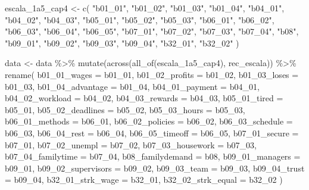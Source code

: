 \documentclass[
  letterpaper,
  DIV=11,
  numbers=noendperiod]{scrreprt}
\newenvironment{Shaded}{\begin{snugshade}}{\end{snugshade}}
\newcommand{\AttributeTok}[1]{\textcolor[rgb]{0.40,0.45,0.13}{#1}}
\newcommand{\FunctionTok}[1]{\textcolor[rgb]{0.28,0.35,0.67}{#1}}
\newcommand{\NormalTok}[1]{\textcolor[rgb]{0.00,0.23,0.31}{#1}}
\newcommand{\OtherTok}[1]{\textcolor[rgb]{0.00,0.23,0.31}{#1}}
\newcommand{\SpecialCharTok}[1]{\textcolor[rgb]{0.37,0.37,0.37}{#1}}
\newcommand{\StringTok}[1]{\textcolor[rgb]{0.13,0.47,0.30}{#1}}
\begin{document}
\begin{Shaded}
\begin{Highlighting}[]
\NormalTok{escala\_1a5\_cap4 }\OtherTok{\textless{}{-}} \FunctionTok{c}\NormalTok{(}
  \StringTok{"b01\_01"}\NormalTok{, }\StringTok{"b01\_02"}\NormalTok{, }\StringTok{"b01\_03"}\NormalTok{, }\StringTok{"b01\_04"}\NormalTok{,}
  \StringTok{"b04\_01"}\NormalTok{, }\StringTok{"b04\_02"}\NormalTok{, }\StringTok{"b04\_03"}\NormalTok{,}
  \StringTok{"b05\_01"}\NormalTok{, }\StringTok{"b05\_02"}\NormalTok{, }\StringTok{"b05\_03"}\NormalTok{,}
  \StringTok{"b06\_01"}\NormalTok{, }\StringTok{"b06\_02"}\NormalTok{, }\StringTok{"b06\_03"}\NormalTok{, }\StringTok{"b06\_04"}\NormalTok{, }\StringTok{"b06\_05"}\NormalTok{,}
  \StringTok{"b07\_01"}\NormalTok{, }\StringTok{"b07\_02"}\NormalTok{, }\StringTok{"b07\_03"}\NormalTok{, }\StringTok{"b07\_04"}\NormalTok{,}
  \StringTok{"b08"}\NormalTok{,}
  \StringTok{"b09\_01"}\NormalTok{, }\StringTok{"b09\_02"}\NormalTok{, }\StringTok{"b09\_03"}\NormalTok{, }\StringTok{"b09\_04"}\NormalTok{,}
  \StringTok{"b32\_01"}\NormalTok{, }\StringTok{"b32\_02"}
\NormalTok{)}

\NormalTok{data }\OtherTok{\textless{}{-}}\NormalTok{ data }\SpecialCharTok{\%\textgreater{}\%}
  \FunctionTok{mutate}\NormalTok{(}\FunctionTok{across}\NormalTok{(}\FunctionTok{all\_of}\NormalTok{(escala\_1a5\_cap4), rec\_escala)) }\SpecialCharTok{\%\textgreater{}\%}
  \FunctionTok{rename}\NormalTok{(}
    \AttributeTok{b01\_01\_wages       =}\NormalTok{ b01\_01,}
    \AttributeTok{b01\_02\_profits     =}\NormalTok{ b01\_02,}
    \AttributeTok{b01\_03\_loses       =}\NormalTok{ b01\_03,}
    \AttributeTok{b01\_04\_advantage   =}\NormalTok{ b01\_04,}
    \AttributeTok{b04\_01\_payment     =}\NormalTok{ b04\_01,}
    \AttributeTok{b04\_02\_workload    =}\NormalTok{ b04\_02,}
    \AttributeTok{b04\_03\_rewards     =}\NormalTok{ b04\_03,}
    \AttributeTok{b05\_01\_tired       =}\NormalTok{ b05\_01,}
    \AttributeTok{b05\_02\_deadlines   =}\NormalTok{ b05\_02,}
    \AttributeTok{b05\_03\_hours       =}\NormalTok{ b05\_03,}
    \AttributeTok{b06\_01\_methods     =}\NormalTok{ b06\_01,}
    \AttributeTok{b06\_02\_policies    =}\NormalTok{ b06\_02,}
    \AttributeTok{b06\_03\_schedule    =}\NormalTok{ b06\_03,}
    \AttributeTok{b06\_04\_rest        =}\NormalTok{ b06\_04,}
    \AttributeTok{b06\_05\_timeoff     =}\NormalTok{ b06\_05,}
    \AttributeTok{b07\_01\_secure      =}\NormalTok{ b07\_01,}
    \AttributeTok{b07\_02\_unempl      =}\NormalTok{ b07\_02,}
    \AttributeTok{b07\_03\_housework   =}\NormalTok{ b07\_03,}
    \AttributeTok{b07\_04\_familytime  =}\NormalTok{ b07\_04,}
    \AttributeTok{b08\_familydemand   =}\NormalTok{ b08,}
    \AttributeTok{b09\_01\_managers    =}\NormalTok{ b09\_01,}
    \AttributeTok{b09\_02\_supervisors =}\NormalTok{ b09\_02,}
    \AttributeTok{b09\_03\_team        =}\NormalTok{ b09\_03,}
    \AttributeTok{b09\_04\_trust       =}\NormalTok{ b09\_04,}
    \AttributeTok{b32\_01\_strk\_wage   =}\NormalTok{ b32\_01,}
    \AttributeTok{b32\_02\_strk\_equal  =}\NormalTok{ b32\_02}
\NormalTok{  )}


\end{Highlighting}
\end{Shaded}
\end{document}
